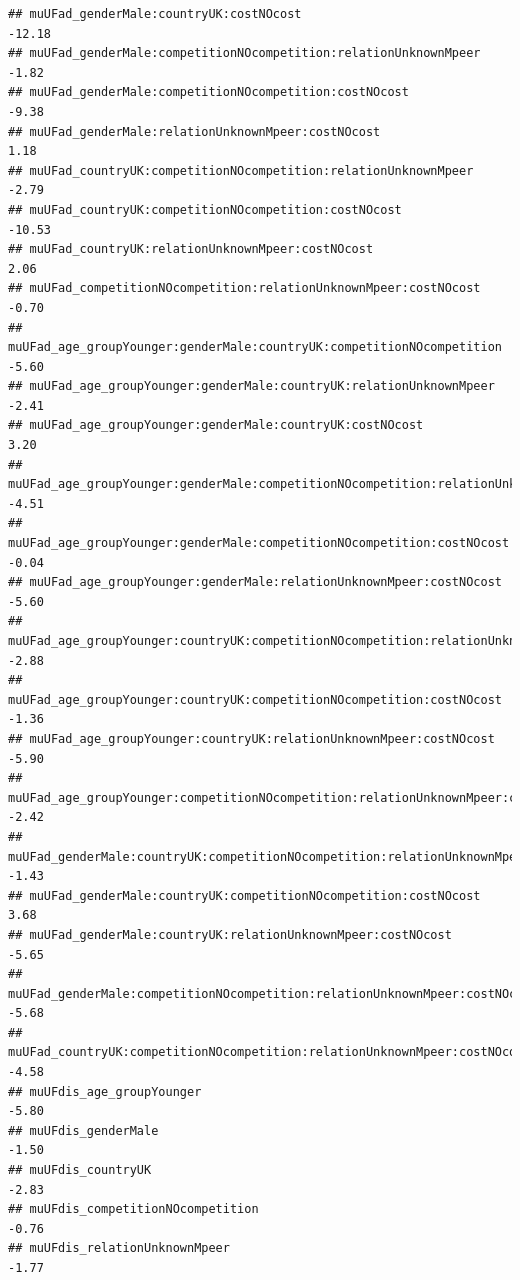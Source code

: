 \documentclass[
]{article}
\begin{document}
\begin{verbatim}
## muUFad_genderMale:countryUK:costNOcost                                              -12.18
## muUFad_genderMale:competitionNOcompetition:relationUnknownMpeer                      -1.82
## muUFad_genderMale:competitionNOcompetition:costNOcost                                -9.38
## muUFad_genderMale:relationUnknownMpeer:costNOcost                                     1.18
## muUFad_countryUK:competitionNOcompetition:relationUnknownMpeer                       -2.79
## muUFad_countryUK:competitionNOcompetition:costNOcost                                -10.53
## muUFad_countryUK:relationUnknownMpeer:costNOcost                                      2.06
## muUFad_competitionNOcompetition:relationUnknownMpeer:costNOcost                      -0.70
## muUFad_age_groupYounger:genderMale:countryUK:competitionNOcompetition                -5.60
## muUFad_age_groupYounger:genderMale:countryUK:relationUnknownMpeer                    -2.41
## muUFad_age_groupYounger:genderMale:countryUK:costNOcost                               3.20
## muUFad_age_groupYounger:genderMale:competitionNOcompetition:relationUnknownMpeer     -4.51
## muUFad_age_groupYounger:genderMale:competitionNOcompetition:costNOcost               -0.04
## muUFad_age_groupYounger:genderMale:relationUnknownMpeer:costNOcost                   -5.60
## muUFad_age_groupYounger:countryUK:competitionNOcompetition:relationUnknownMpeer      -2.88
## muUFad_age_groupYounger:countryUK:competitionNOcompetition:costNOcost                -1.36
## muUFad_age_groupYounger:countryUK:relationUnknownMpeer:costNOcost                    -5.90
## muUFad_age_groupYounger:competitionNOcompetition:relationUnknownMpeer:costNOcost     -2.42
## muUFad_genderMale:countryUK:competitionNOcompetition:relationUnknownMpeer            -1.43
## muUFad_genderMale:countryUK:competitionNOcompetition:costNOcost                       3.68
## muUFad_genderMale:countryUK:relationUnknownMpeer:costNOcost                          -5.65
## muUFad_genderMale:competitionNOcompetition:relationUnknownMpeer:costNOcost           -5.68
## muUFad_countryUK:competitionNOcompetition:relationUnknownMpeer:costNOcost            -4.58
## muUFdis_age_groupYounger                                                             -5.80
## muUFdis_genderMale                                                                   -1.50
## muUFdis_countryUK                                                                    -2.83
## muUFdis_competitionNOcompetition                                                     -0.76
## muUFdis_relationUnknownMpeer                                                         -1.77

\end{verbatim}
\end{document}
